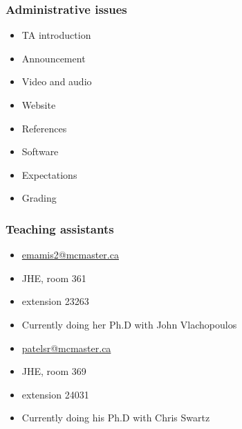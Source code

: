 \begin{frame}\frametitle{Administrative issues}
	\begin{itemize}
		\item	TA introduction 
		\item	Announcement 
		\item	Video and audio 
		\item	Website 
		\item	References 
		\item	Software 
		\item	Expectations 
		\item	Grading 
	\end{itemize}
\end{frame}

\begin{frame}\frametitle{Teaching assistants}
	\vspace{12pt}
	{\color{myGreen}{Maryam Emami}}
	\begin{itemize}
		\item	\url{emamis2@mcmaster.ca}
		\item	JHE, room 361
		\item	extension  23263
		\item	Currently doing her Ph.D with John Vlachopoulos
	\end{itemize}
	\vspace{12pt}
	{\color{myGreen}{Shailesh Patel}}
	\begin{itemize}
		\item	\url{patelsr@mcmaster.ca}
		\item	JHE, room 369
		\item	extension 24031
		\item	Currently doing his Ph.D with Chris Swartz
	\end{itemize}
	\vspace{24pt}

	{\color{myOrange}{Office hours for both TAs are by email appointment}}
\end{frame}

